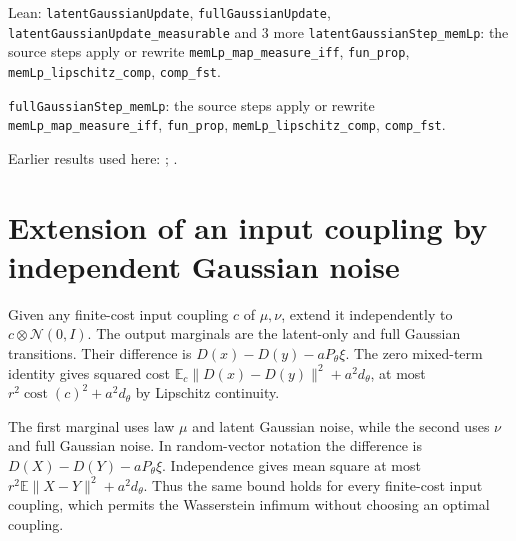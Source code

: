 \documentclass[11pt,a4paper]{article}
\begin{document}
\begin{leanbox}{Lean: \texttt{latentGaussianUpdate}, \texttt{fullGaussianUpdate}, \texttt{latentGaussianUpdate\_\allowbreak{}measurable} and 3 more}
\texttt{latent\allowbreak{}Gaussian\allowbreak{}Step\_\allowbreak{}mem\allowbreak{}Lp}: the source steps apply or rewrite \texttt{mem\allowbreak{}Lp\_\allowbreak{}map\_\allowbreak{}measure\_\allowbreak{}iff}, \texttt{fun\_\allowbreak{}prop}, \texttt{mem\allowbreak{}Lp\_\allowbreak{}lipschitz\_\allowbreak{}comp}, \texttt{comp\_\allowbreak{}fst}.



\texttt{full\allowbreak{}Gaussian\allowbreak{}Step\_\allowbreak{}mem\allowbreak{}Lp}: the source steps apply or rewrite \texttt{mem\allowbreak{}Lp\_\allowbreak{}map\_\allowbreak{}measure\_\allowbreak{}iff}, \texttt{fun\_\allowbreak{}prop}, \texttt{mem\allowbreak{}Lp\_\allowbreak{}lipschitz\_\allowbreak{}comp}, \texttt{comp\_\allowbreak{}fst}.
\end{leanbox}


Earlier results used here: \cite[Section~3.33.5]{LangevinLean2026ULASC}; \cite[Section~3.1.1]{LangevinLean2026IPLA}.

\section{\texorpdfstring{Extension of an input coupling by independent Gaussian noise}{Extension of an input coupling by independent Gaussian noise}}


Given any finite-cost input coupling \(c\) of \(\mu,\nu\), extend it independently to \(c\otimes\mathcal N(0,I)\). The output marginals are the latent-only and full Gaussian transitions. Their difference is \(D(x)-D(y)-aP_\theta\xi\). The zero mixed-term identity gives squared cost \(\mathbb E_c\|D(x)-D(y)\|^2+a^2d_\theta\), at most \(r^2\operatorname{cost}(c)^2+a^2d_\theta\) by Lipschitz continuity.



The first marginal uses law \(\mu\) and latent Gaussian noise, while the second uses \(\nu\) and full Gaussian noise. In random-vector notation the difference is \(D(X)-D(Y)-aP_\theta\xi\). Independence gives mean square at most \(r^2\mathbb E\|X-Y\|^2+a^2d_\theta\). Thus the same bound holds for every finite-cost input coupling, which permits the Wasserstein infimum without choosing an optimal coupling.
\end{document}
